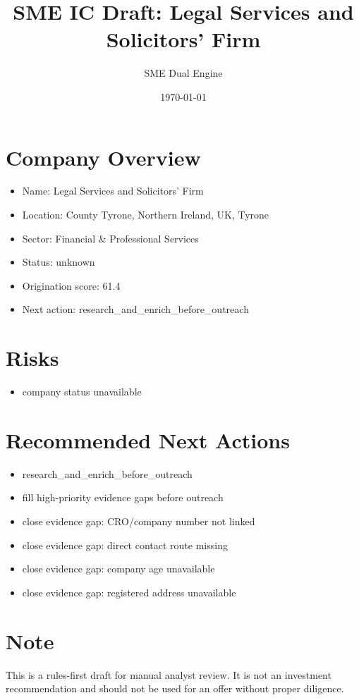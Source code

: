\documentclass[11pt,a4paper]{article}
\title{SME IC Draft: Legal Services and Solicitors' Firm}
\author{SME Dual Engine}
\date{\today}
\begin{document}
\maketitle
\section*{Company Overview}
\begin{itemize}[leftmargin=1.4em]
\item Name: Legal Services and Solicitors' Firm
\item Location: County Tyrone, Northern Ireland, UK, Tyrone
\item Sector: Financial \& Professional Services
\item Status: unknown
\item Origination score: 61.4
\item Next action: research\_and\_enrich\_before\_outreach
\end{itemize}
\section*{Risks}
\begin{itemize}[leftmargin=1.4em]
\item company status unavailable
\end{itemize}
\section*{Recommended Next Actions}
\begin{itemize}[leftmargin=1.4em]
\item research\_and\_enrich\_before\_outreach
\item fill high-priority evidence gaps before outreach
\item close evidence gap: CRO/company number not linked
\item close evidence gap: direct contact route missing
\item close evidence gap: company age unavailable
\item close evidence gap: registered address unavailable
\end{itemize}
\section*{Note}
This is a rules-first draft for manual analyst review. It is not an investment
recommendation and should not be used for an offer without proper diligence.
\end{document}
